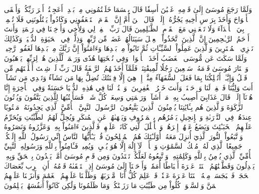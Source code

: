وَلَمَّا رَجَعَ مُوسَىٰٓ إِلَىٰ قَوۡمِهِۦ غَضۡبَٰنَ أَسِفٗا قَالَ بِئۡسَمَا خَلَفۡتُمُونِي مِنۢ بَعۡدِيٓۖ أَعَجِلۡتُمۡ أَمۡرَ رَبِّكُمۡۖ وَأَلۡقَى ٱلۡأَلۡوَاحَ وَأَخَذَ بِرَأۡسِ أَخِيهِ يَجُرُّهُۥٓ إِلَيۡهِۚ قَالَ ٱبۡنَ أُمَّ إِنَّ ٱلۡقَوۡمَ ٱسۡتَضۡعَفُونِي وَكَادُواْ يَقۡتُلُونَنِي فَلَا تُشۡمِتۡ بِيَ ٱلۡأَعۡدَآءَ وَلَا تَجۡعَلۡنِي مَعَ ٱلۡقَوۡمِ ٱلظَّـٰلِمِينَ
قَالَ رَبِّ ٱغۡفِرۡ لِي وَلِأَخِي وَأَدۡخِلۡنَا فِي رَحۡمَتِكَۖ وَأَنتَ أَرۡحَمُ ٱلرَّـٰحِمِينَ
إِنَّ ٱلَّذِينَ ٱتَّخَذُواْ ٱلۡعِجۡلَ سَيَنَالُهُمۡ غَضَبٞ مِّن رَّبِّهِمۡ وَذِلَّةٞ فِي ٱلۡحَيَوٰةِ ٱلدُّنۡيَاۚ وَكَذَٰلِكَ نَجۡزِي ٱلۡمُفۡتَرِينَ
وَٱلَّذِينَ عَمِلُواْ ٱلسَّيِّـَٔاتِ ثُمَّ تَابُواْ مِنۢ بَعۡدِهَا وَءَامَنُوٓاْ إِنَّ رَبَّكَ مِنۢ بَعۡدِهَا لَغَفُورٞ رَّحِيمٞ
وَلَمَّا سَكَتَ عَن مُّوسَى ٱلۡغَضَبُ أَخَذَ ٱلۡأَلۡوَاحَۖ وَفِي نُسۡخَتِهَا هُدٗى وَرَحۡمَةٞ لِّلَّذِينَ هُمۡ لِرَبِّهِمۡ يَرۡهَبُونَ
وَٱخۡتَارَ مُوسَىٰ قَوۡمَهُۥ سَبۡعِينَ رَجُلٗا لِّمِيقَٰتِنَاۖ فَلَمَّآ أَخَذَتۡهُمُ ٱلرَّجۡفَةُ قَالَ رَبِّ لَوۡ شِئۡتَ أَهۡلَكۡتَهُم مِّن قَبۡلُ وَإِيَّـٰيَۖ أَتُهۡلِكُنَا بِمَا فَعَلَ ٱلسُّفَهَآءُ مِنَّآۖ إِنۡ هِيَ إِلَّا فِتۡنَتُكَ تُضِلُّ بِهَا مَن تَشَآءُ وَتَهۡدِي مَن تَشَآءُۖ أَنتَ وَلِيُّنَا فَٱغۡفِرۡ لَنَا وَٱرۡحَمۡنَاۖ وَأَنتَ خَيۡرُ ٱلۡغَٰفِرِينَ
۞وَٱكۡتُبۡ لَنَا فِي هَٰذِهِ ٱلدُّنۡيَا حَسَنَةٗ وَفِي ٱلۡأٓخِرَةِ إِنَّا هُدۡنَآ إِلَيۡكَۚ قَالَ عَذَابِيٓ أُصِيبُ بِهِۦ مَنۡ أَشَآءُۖ وَرَحۡمَتِي وَسِعَتۡ كُلَّ شَيۡءٖۚ فَسَأَكۡتُبُهَا لِلَّذِينَ يَتَّقُونَ وَيُؤۡتُونَ ٱلزَّكَوٰةَ وَٱلَّذِينَ هُم بِـَٔايَٰتِنَا يُؤۡمِنُونَ
ٱلَّذِينَ يَتَّبِعُونَ ٱلرَّسُولَ ٱلنَّبِيَّ ٱلۡأُمِّيَّ ٱلَّذِي يَجِدُونَهُۥ مَكۡتُوبًا عِندَهُمۡ فِي ٱلتَّوۡرَىٰةِ وَٱلۡإِنجِيلِ يَأۡمُرُهُم بِٱلۡمَعۡرُوفِ وَيَنۡهَىٰهُمۡ عَنِ ٱلۡمُنكَرِ وَيُحِلُّ لَهُمُ ٱلطَّيِّبَٰتِ وَيُحَرِّمُ عَلَيۡهِمُ ٱلۡخَبَـٰٓئِثَ وَيَضَعُ عَنۡهُمۡ إِصۡرَهُمۡ وَٱلۡأَغۡلَٰلَ ٱلَّتِي كَانَتۡ عَلَيۡهِمۡۚ فَٱلَّذِينَ ءَامَنُواْ بِهِۦ وَعَزَّرُوهُ وَنَصَرُوهُ وَٱتَّبَعُواْ ٱلنُّورَ ٱلَّذِيٓ أُنزِلَ مَعَهُۥٓ أُوْلَـٰٓئِكَ هُمُ ٱلۡمُفۡلِحُونَ
قُلۡ يَـٰٓأَيُّهَا ٱلنَّاسُ إِنِّي رَسُولُ ٱللَّهِ إِلَيۡكُمۡ جَمِيعًا ٱلَّذِي لَهُۥ مُلۡكُ ٱلسَّمَٰوَٰتِ وَٱلۡأَرۡضِۖ لَآ إِلَٰهَ إِلَّا هُوَ يُحۡيِۦ وَيُمِيتُۖ فَـَٔامِنُواْ بِٱللَّهِ وَرَسُولِهِ ٱلنَّبِيِّ ٱلۡأُمِّيِّ ٱلَّذِي يُؤۡمِنُ بِٱللَّهِ وَكَلِمَٰتِهِۦ وَٱتَّبِعُوهُ لَعَلَّكُمۡ تَهۡتَدُونَ
وَمِن قَوۡمِ مُوسَىٰٓ أُمَّةٞ يَهۡدُونَ بِٱلۡحَقِّ وَبِهِۦ يَعۡدِلُونَ
وَقَطَّعۡنَٰهُمُ ٱثۡنَتَيۡ عَشۡرَةَ أَسۡبَاطًا أُمَمٗاۚ وَأَوۡحَيۡنَآ إِلَىٰ مُوسَىٰٓ إِذِ ٱسۡتَسۡقَىٰهُ قَوۡمُهُۥٓ أَنِ ٱضۡرِب بِّعَصَاكَ ٱلۡحَجَرَۖ فَٱنۢبَجَسَتۡ مِنۡهُ ٱثۡنَتَا عَشۡرَةَ عَيۡنٗاۖ قَدۡ عَلِمَ كُلُّ أُنَاسٖ مَّشۡرَبَهُمۡۚ وَظَلَّلۡنَا عَلَيۡهِمُ ٱلۡغَمَٰمَ وَأَنزَلۡنَا عَلَيۡهِمُ ٱلۡمَنَّ وَٱلسَّلۡوَىٰۖ كُلُواْ مِن طَيِّبَٰتِ مَا رَزَقۡنَٰكُمۡۚ وَمَا ظَلَمُونَا وَلَٰكِن كَانُوٓاْ أَنفُسَهُمۡ يَظۡلِمُونَ
